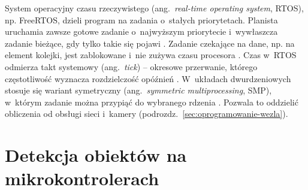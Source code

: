 System operacyjny czasu rzeczywistego (ang.~\textit{real-time operating
system}, RTOS), np. FreeRTOS, dzieli program na zadania o~stałych
priorytetach. Planista uruchamia zawsze gotowe zadanie o~najwyższym
priorytecie i~wywłaszcza zadanie bieżące, gdy tylko takie się pojawi
\cite{barry_freertos}. Zadanie czekające na dane, np. na
element kolejki, jest zablokowane i~nie zużywa czasu procesora
\cite{barry_freertos}. Czas w~RTOS odmierza takt
systemowy (ang.~\textit{tick}) -- okresowe przerwanie, którego częstotliwość
wyznacza rozdzielczość opóźnień \cite{barry_freertos}.
W~układach dwurdzeniowych stosuje się wariant symetryczny
(ang.~\textit{symmetric multiprocessing}, SMP), w~którym zadanie można
przypiąć do wybranego rdzenia \cite{espressif_idf_freertos}. Pozwala to
oddzielić obliczenia od obsługi sieci i~kamery
(podrozdz.~\ref{sec:oprogramowanie-wezla}).


\section{Detekcja obiektów na mikrokontrolerach}
\label{sec:detekcja-mcu}


